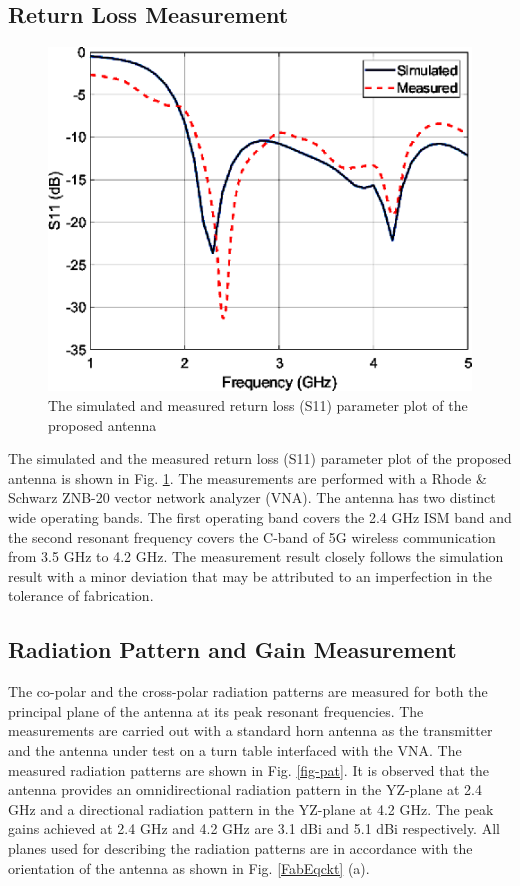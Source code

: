 \subsection{Return Loss Measurement}
\begin{figure}
\centering
\includegraphics[width=0.5\linewidth]{Fig-aeue_6.eps}
\caption{The simulated and measured return loss (S11) parameter plot of the proposed antenna}\label{fig-s11}
\end{figure}

The simulated and the measured return loss (S11) parameter plot of the proposed antenna is shown in Fig. \ref{fig-s11}. The measurements are performed with a Rhode \& Schwarz ZNB-20 vector network analyzer (VNA). The antenna has two distinct wide operating bands. The first operating band covers the 2.4 GHz ISM band and the second resonant frequency covers the C-band of 5G wireless communication from 3.5 GHz to 4.2 GHz. The measurement result closely follows the simulation result with a minor deviation that may be attributed to an imperfection in the tolerance of fabrication.

\subsection{Radiation Pattern and Gain Measurement}
The co-polar and the cross-polar radiation patterns are measured for both the principal plane of the antenna at its peak resonant frequencies. The measurements are carried out with a standard horn antenna as the transmitter and the antenna under test on a turn table interfaced with the VNA. The measured radiation patterns are shown in Fig. \ref{fig-pat}. It is observed that the antenna provides an omnidirectional radiation pattern in the YZ-plane at 2.4 GHz and a directional radiation pattern in the YZ-plane at 4.2 GHz. The peak gains achieved at 2.4 GHz and 4.2 GHz are 3.1 dBi and 5.1 dBi respectively. All planes used for describing the radiation patterns are in accordance with the orientation of the antenna as shown in Fig. \ref{FabEqckt} (a).

